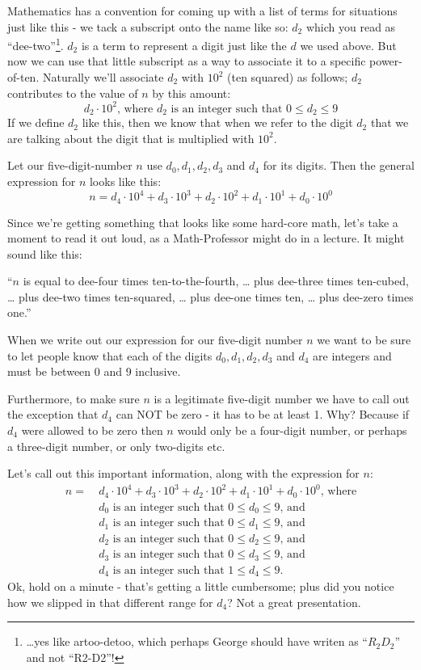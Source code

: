 \documentclass{article}
\newenvironment{jprIn}{\begin{adjustwidth}{2em}{}}{\end{adjustwidth}}
\begin{document}
Mathematics has a convention for coming up with
a list of terms for situations just like this -
we tack a subscript onto the name like so: $d_2$ which you read as ``dee-two''\footnote{\dots{}yes like artoo-detoo, which perhaps
George should have writen as ``$R_2D_2$'' and not ``R2-D2''!}.
$d_2$ is a term to represent a digit just like the $d$ we used above.  But now we can use that little subscript as a way to
associate it to a specific power-of-ten. Naturally we'll associate $d_2$ with $10^2$ (ten squared) as follows; $d_2$ contributes to
the value of $n$ by this amount:
\[d_2\cdot10^2\text{, where }d_2\text{ is an integer such that }0\le{}d_2\le{}9\]
If we define $d_2$ like this, then we know that when we refer to the digit $d_2$
that we are talking about the digit that is multiplied with $10^2$.

Let our five-digit-number $n$ use $d_0,d_1,d_2,d_3$ and $d_4$ for its digits. Then
the general expression for $n$ looks like this:
\[n=d_4{\cdot}10^4+d_3{\cdot}10^3+d_2{\cdot}10^2+d_1{\cdot}10^1+d_0{\cdot}10^0\]

Since we're getting something that looks like some hard-core math, let's take a moment
to read it out loud, as a Math-Professor might do in a lecture.  It might sound like this:
\begin{jprIn}
``$n$ is equal to dee-four times ten-to-the-fourth, \dots{}
plus dee-three times ten-cubed, \dots{} plus dee-two times ten-squared,  \dots{} plus dee-one times ten,  \dots{} plus dee-zero times one.''
\end{jprIn}

When we write out our expression for our five-digit number $n$ we want to be sure
to let people know that each of the digits $d_0,d_1,d_2,d_3$ and $d_4$ are integers and must be between 0 and 9 inclusive.

Furthermore, to make sure $n$ is a legitimate five-digit number we have to call out the exception that $d_4$ can NOT be zero - it has to be at least 1.
Why? Because if $d_4$ were allowed to be zero then $n$ would only be a four-digit number, or perhaps a three-digit number, or only two-digits etc.

Let's call out this important information, along with the expression for $n$:
\begin{align*}
n =\ &d_4{\cdot}10^4+d_3{\cdot}10^3+d_2{\cdot}10^2+d_1{\cdot}10^1+d_0{\cdot}10^0\text{, where}\\
& d_0\text{ is an integer such that }0\le{}d_0\le{}9\text{, and}\\
& d_1\text{ is an integer such that }0\le{}d_1\le{}9\text{, and}\\
& d_2\text{ is an integer such that }0\le{}d_2\le{}9\text{, and}\\
& d_3\text{ is an integer such that }0\le{}d_3\le{}9\text{, and}\\
& d_4\text{ is an integer such that }1\le{}d_4\le{}9.
\end{align*}
Ok, hold on a minute - that's getting a little cumbersome;
plus did  you notice how we slipped in that different range for $d_4$?
Not a great presentation.
\end{document}
